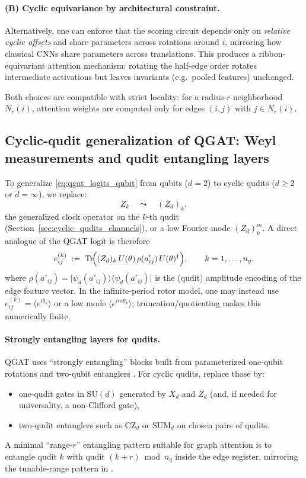 \documentclass[11pt,oneside]{amsbook}
\numberwithin{equation}{section}
\theoremstyle{plain}
\theoremstyle{definition}
\theoremstyle{remark}
\newcommand{\ket}[1]{\lvert #1 \rangle}
\newcommand{\bra}[1]{\langle #1 \rvert}
\begin{document}
\paragraph{(B) Cyclic equivariance by architectural constraint.}
Alternatively, one can enforce that the scoring circuit depends only on \emph{relative cyclic offsets} and share parameters across
rotations around $i$, mirroring how classical CNNs share parameters across translations.
This produces a ribbon-equivariant attention mechanism: rotating the half-edge order rotates intermediate activations but leaves
invariants (e.g.\ pooled features) unchanged.

Both choices are compatible with strict locality: for a radius-$r$ neighborhood $N_r(i)$, attention weights are computed only for
edges $(i,j)$ with $j\in N_r(i)$.

\subsection{Cyclic-qudit generalization of QGAT: Weyl measurements and qudit entangling layers}
\label{subsec:qgat_qudit_generalization}

To generalize \eqref{eq:qgat_logits_qubit} from qubits ($d=2$) to cyclic qudits ($d\ge 2$ or $d=\infty$), we replace:
\[
  Z_k \quad\leadsto\quad (Z_d)_k,
\]
the generalized clock operator on the $k$-th qudit (Section~\ref{sec:cyclic_qudits_channels}), or a low Fourier mode $(Z_d)_k^m$.
A direct analogue of the QGAT logit is therefore
\begin{equation}
  e^{(k)}_{ij}
  \;:=\;
  \mathrm{Tr}\!\Bigl(
    (Z_d)_k\,
    U(\theta)\,
    \rho(a'_{ij})\,
    U(\theta)^\dagger
  \Bigr),
  \qquad k=1,\dots,n_q,
  \label{eq:qgat_logits_qudit}
\end{equation}
where $\rho(a'_{ij})=\ket{\psi_d(a'_{ij})}\!\bra{\psi_d(a'_{ij})}$ is the (qudit) amplitude encoding of the edge feature vector.
In the infinite-period rotor model, one may instead use $e^{(k)}_{ij}=\langle e^{i\theta_k}\rangle$ or a low mode
$\langle e^{im\theta_k}\rangle$; truncation/quotienting makes this numerically finite.

\paragraph{Strongly entangling layers for qudits.}
QGAT uses ``strongly entangling'' blocks built from parameterized one-qubit rotations and two-qubit entanglers \cite{Ning2025QGAT}.
For cyclic qudits, replace those by:
\begin{itemize}
\item one-qudit gates in $\mathrm{SU}(d)$ generated by $X_d$ and $Z_d$ (and, if needed for universality, a non-Clifford gate),
\item two-qudit entanglers such as $\mathrm{CZ}_d$ or $\mathrm{SUM}_d$ on chosen pairs of qudits.
\end{itemize}
A minimal ``range-$r$'' entangling pattern suitable for graph attention is to entangle qudit $k$ with qudit $(k+r)\bmod n_q$ inside
the edge register, mirroring the tunable-range pattern in \cite{Ning2025QGAT}.
\end{document}
